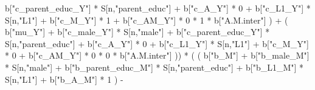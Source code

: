 \documentclass[
]{book}
\newenvironment{Shaded}{\begin{snugshade}}{\end{snugshade}}
\newcommand{\DecValTok}[1]{\textcolor[rgb]{0.00,0.00,0.81}{#1}}
\newcommand{\NormalTok}[1]{#1}
\newcommand{\SpecialCharTok}[1]{\textcolor[rgb]{0.00,0.00,0.00}{#1}}
\newcommand{\StringTok}[1]{\textcolor[rgb]{0.31,0.60,0.02}{#1}}
\begin{document}
\begin{Shaded}
\begin{Highlighting}[]
\NormalTok{                                 b[}\StringTok{"c\_parent\_educ\_Y"}\NormalTok{] }\SpecialCharTok{*}\NormalTok{ S[n,}\StringTok{"parent\_educ"}\NormalTok{] }\SpecialCharTok{+} 
\NormalTok{                                 b[}\StringTok{"c\_A\_Y"}\NormalTok{] }\SpecialCharTok{*} \DecValTok{0} \SpecialCharTok{+} 
\NormalTok{                                 b[}\StringTok{"c\_L1\_Y"}\NormalTok{] }\SpecialCharTok{*}\NormalTok{ S[n,}\StringTok{"L1"}\NormalTok{] }\SpecialCharTok{+}
\NormalTok{                                 b[}\StringTok{"c\_M\_Y"}\NormalTok{] }\SpecialCharTok{*} \DecValTok{1} \SpecialCharTok{+}
\NormalTok{                                 b[}\StringTok{"c\_AM\_Y"}\NormalTok{] }\SpecialCharTok{*} \DecValTok{0} \SpecialCharTok{*} \DecValTok{1} \SpecialCharTok{*}\NormalTok{ b[}\StringTok{"A.M.inter"}\NormalTok{] ) }\SpecialCharTok{+} 
\NormalTok{                             ( b[}\StringTok{"mu\_Y"}\NormalTok{] }\SpecialCharTok{+} 
\NormalTok{                                 b[}\StringTok{"c\_male\_Y"}\NormalTok{] }\SpecialCharTok{*}\NormalTok{ S[n,}\StringTok{"male"}\NormalTok{] }\SpecialCharTok{+} 
\NormalTok{                                 b[}\StringTok{"c\_parent\_educ\_Y"}\NormalTok{] }\SpecialCharTok{*}\NormalTok{ S[n,}\StringTok{"parent\_educ"}\NormalTok{] }\SpecialCharTok{+} 
\NormalTok{                                 b[}\StringTok{"c\_A\_Y"}\NormalTok{] }\SpecialCharTok{*} \DecValTok{0} \SpecialCharTok{+} 
\NormalTok{                                 b[}\StringTok{"c\_L1\_Y"}\NormalTok{] }\SpecialCharTok{*}\NormalTok{ S[n,}\StringTok{"L1"}\NormalTok{] }\SpecialCharTok{+}
\NormalTok{                                 b[}\StringTok{"c\_M\_Y"}\NormalTok{] }\SpecialCharTok{*} \DecValTok{0} \SpecialCharTok{+}
\NormalTok{                                 b[}\StringTok{"c\_AM\_Y"}\NormalTok{] }\SpecialCharTok{*} \DecValTok{0} \SpecialCharTok{*} \DecValTok{0} \SpecialCharTok{*}\NormalTok{ b[}\StringTok{"A.M.inter"}\NormalTok{] )) }\SpecialCharTok{*}
\NormalTok{      ( ( b[}\StringTok{"b\_M"}\NormalTok{] }\SpecialCharTok{+} 
\NormalTok{            b[}\StringTok{"b\_male\_M"}\NormalTok{] }\SpecialCharTok{*}\NormalTok{ S[n,}\StringTok{"male"}\NormalTok{] }\SpecialCharTok{+} 
\NormalTok{            b[}\StringTok{"b\_parent\_educ\_M"}\NormalTok{] }\SpecialCharTok{*}\NormalTok{ S[n,}\StringTok{"parent\_educ"}\NormalTok{] }\SpecialCharTok{+} 
\NormalTok{            b[}\StringTok{"b\_L1\_M"}\NormalTok{] }\SpecialCharTok{*}\NormalTok{ S[n,}\StringTok{"L1"}\NormalTok{] }\SpecialCharTok{+}
\NormalTok{            b[}\StringTok{"b\_A\_M"}\NormalTok{] }\SpecialCharTok{*} \DecValTok{1}\NormalTok{ ) }\SpecialCharTok{{-}} 

\end{Highlighting}
\end{Shaded}
\end{document}
